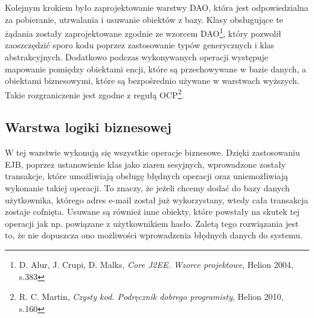 Kolejnym krokiem było zaprojektowanie warstwy DAO, która jest odpowiedzialna za pobieranie, utrwalania i usuwanie obiektów z bazy. Klasy obsługujące te żądania zostały zaprojektowane zgodnie ze wzorcem DAO\footnote{D. Alur, J. Crupi, D. Malks, \textit{Core J2EE. Wzorce projektowe}, Helion 2004, s.383}, który pozwolił zaoszczędzić sporo kodu poprzez zastosowanie typów generycznych i klas abstrakcyjnych. Dodatkowo podczas wykonywanych operacji występuje mapowanie pomiędzy obiektami encji, które są przechowywane w bazie danych, a obiektami biznesowymi, które są bezpośrednio używane w warstwach wyższych. Takie rozgraniczenie jest zgodne z regułą OCP\footnote{R. C. Martin, \textit{Czysty kod. Podręcznik dobrego programisty}, Helion 2010, s.160}.


\subsection{Warstwa logiki biznesowej}
W tej warstwie wykonują się wszystkie operacje biznesowe. Dzięki zastosowaniu EJB, poprzez ustanowienie klas jako ziaren sesyjnych, wprowadzone zostały transakcje, które umożliwiają obsługę błędnych operacji oraz uniemożliwiają wykonanie takiej operacji. To znaczy, że jeżeli chcemy dodać do bazy danych użytkownika, którego adres e-mail został już wykorzystany, wtedy cała transakcja zostaje cofnięta. Usuwane są również inne obiekty, które powstały na skutek tej operacji jak np. powiązane z użytkownikiem hasło. Zaletą tego rozwiązania jest to, że nie dopuszcza ono możliwości wprowadzenia błędnych danych do systemu.